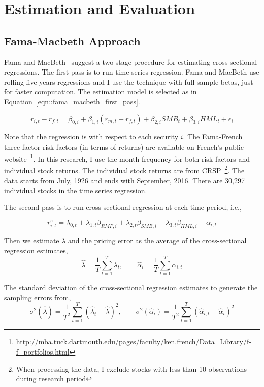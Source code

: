 \documentclass[11pt,reqno,final]{amsart}
\begin{document}
\bigskip


\section{Estimation and Evaluation}
\subsection{Fama-Macbeth Approach}
Fama and MacBeth~\cite{FM73} suggest a two-stage procedure for estimating cross-sectional regressions. The first pass is to run time-series regression. Fama and MacBeth use rolling five years regressions and I use the technique with full-sample betas, just for faster computation. The estimation model is selected as in Equation~\ref{eqn::fama_macbeth_first_pass}.

\begin{equation} \label{eqn::fama_macbeth_first_pass}
r_{i,t} - r_{f, t} = \beta_{0, i} + \beta_{1, i} (r_{m, t}-r_{f, t}) + \beta_{2, i} SMB_t + \beta_{3, i} HML_t + \epsilon_i
\end{equation}


Note that the regression is with respect to each security $i$. The Fama-French three-factor risk factors (in terms of returns) are available on French's public website~\footnote{\url{http://mba.tuck.dartmouth.edu/pages/faculty/ken.french/Data_Library/f-f_portfolios.html}}. In this research, I use the month frequency for both risk factors and individual stock returns. The individual stock returns are from CRSP~\footnote{When processing the data, I exclude stocks with less than 10 observations during research period}. The data starts from July, 1926 and ends with September, 2016. There are 30,297 individual stocks in the time series regression.

The second pass is to run cross-sectional regression at each time period, i.e.,

\begin{equation} \label{eqn::fama_macbeth_second_pass}
r^e_{i,t} = \lambda_{0, t} + \lambda_{1, t} \beta_{RMF, i} + \lambda_{2, t} \beta_{SMB, i} + \lambda_{3, t} \beta_{HML, i} + \alpha_{i,t}
\end{equation}


Then we estimate $\lambda$ and the pricing error as the average of the cross-sectional regression estimates,
$$
\hat{\lambda} = \frac{1}{T} \sum_{t=1}^{T} \lambda_{t}, \qquad \hat{\alpha}_i = \frac{1}{T} \sum_{t=1}^{T} \alpha_{i,t}
$$

The standard deviation of the cross-sectional regression estimates to generate the sampling errors from,
$$
\sigma^2(\hat{\lambda}) = \frac{1}{T^2} \sum_{t=1}^T (\hat{\lambda}_t - \hat{\lambda})^2, \qquad \sigma^2(\hat{\alpha}_i) = \frac{1}{T^2} \sum_{t=1}^T (\hat{\alpha}_{i,t} - \hat{\alpha}_i)^2
$$
\end{document}
